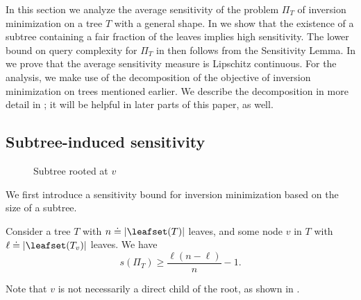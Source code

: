 In this section we analyze the average sensitivity of the problem $\Pi_T$ of inversion minimization on a tree $T$ with a general shape. In  we show that the existence of a subtree containing a fair fraction of the leaves implies high sensitivity. The lower bound on query complexity for $\Pi_T$ in  then follows from the Sensitivity Lemma. In  we prove that the average sensitivity measure is Lipschitz continuous. For the analysis, we make use of the decomposition of the objective of inversion minimization on trees mentioned earlier. We describe the decomposition in more detail in ; it will be helpful in later parts of this paper, as well. 

\subsection{Subtree-induced sensitivity}
\label{sec:sensitivity:subtree}

\begin{figure}
    \centering
    \caption{Subtree rooted at $v$}
    \label{fig:k-ary:subtree}
\end{figure}

We first introduce a sensitivity bound for inversion minimization based on the size of a subtree. 

\begin{lemma}
    \label{lemma:k-ary:subtree-sensitivity}
    Consider a tree $T$ with $n \doteq \lvert\leafset(T)\rvert$ leaves, and some node $v$ in $T$ with $\ell \doteq \lvert\leafset(T_v)\rvert$ leaves. We have
    \[s(\Pi_T) \ge \frac{\ell(n-\ell)}{n}-1. \]
\end{lemma}
Note that $v$ is not necessarily a direct child of the root, as shown in .

